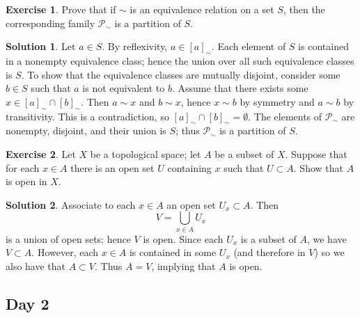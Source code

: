 \documentclass{article}
\theoremstyle{definition}
\newtheorem{exercise}{Exercise}
\newtheorem*{solution}{Solution}
\begin{document}
\begin{exercise}
    Prove that if \(\sim\) is an equivalence relation on a set \(S\), then the corresponding family \(\mathscr{P}_\sim\) is a partition of \(S\).
\end{exercise}
\begin{solution}
    Let \(a\in S\). By reflexivity, \(a\in[a]_\sim\). Each element of \(S\) is contained in a nonempty equivalence class; hence the union over all such equivalence classes is \(S\). To show that the equivalence classes are mutually disjoint, consider some \(b\in S\) such that \(a\) is not equivalent to \(b\). Assume that there exists some \(x\in [a]_\sim\cap[b]_\sim\). Then \(a\sim x\) and \(b\sim x\), hence \(x\sim b\) by symmetry and \(a\sim b\) by transitivity. This is a contradiction, so \([a]_\sim\cap[b]_\sim=\emptyset\). The elements of \(\mathscr{P}_\sim\) are nonempty, disjoint, and their union is \(S\); thus \(\mathscr{P}_\sim\) is a partition of \(S\).
\end{solution}

\begin{exercise}
    Let \(X\) be a topological space; let \(A\) be a subset of \(X\). Suppose that for each \(x\in A\) there is an open set \(U\) containing \(x\) such that \(U\subset A\). Show that \(A\) is open in \(X\).
\end{exercise}
\begin{solution}
    Associate to each \(x\in A\) an open set \(U_x\subset A\). Then
    \[V=\bigcup_{x\in A} U_x\]
    is a union of open sets; hence \(V\) is open. Since each \(U_x\) is a subset of \(A\), we have \(V\subset A\). However, each \(x\in A\) is contained in some \(U_x\) (and therefore in \(V\)) so we also have that \(A\subset V\). Thus \(A=V\), implying that \(A\) is open.
\end{solution}

\subsection*{Day 2}
\end{document}
